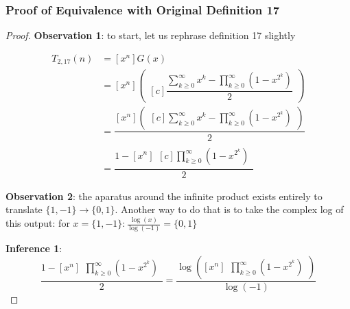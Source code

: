 \documentclass[conference]{IEEEtran}
\begin{document}

\subsubsection{Proof of Equivalence with Original Definition 17}

\begin{proof}
\par\noindent\par
\textbf{Observation 1}: to start, let us rephrase definition 17 slightly

\begin{equation}
\begin{aligned}
T_{2,17}(n) &= [x^n]G(x) \\
    &= [x^n] \left(\begin{aligned}[c]
    \dfrac{\displaystyle\sum_{k\ge0}^\infty x^k - \prod_{k \ge 0}^\infty (1 - x^{2^k})}{2}
    \end{aligned}\right) \\
    &= \dfrac{[x^n] \left(\begin{aligned}[c]
    \displaystyle\sum_{k\ge0}^\infty x^k - \prod_{k \ge 0}^\infty (1 - x^{2^k})\end{aligned}\right)}{2}
     \\
    &= \dfrac{1 - [x^n]\begin{aligned}[c]
    \displaystyle\prod_{k \ge 0}^\infty (1 - x^{2^k})
    \end{aligned}
    }{2}
\end{aligned}
\end{equation}

\textbf{Observation 2}: the aparatus around the infinite product exists entirely to translate $\{1, -1\} \to \{0, 1\}$. Another way to do that is to take the complex log of this output: for $x = \{1, -1\}: \tfrac{\log(x)}{\log(-1)} = \{0, 1\}$

\textbf{Inference 1}: \begin{equation}
    \dfrac{1 - [x^n]\begin{aligned}
    \displaystyle\prod_{k \ge 0}^\infty (1 - x^{2^k})
    \end{aligned}
    }{2} = \dfrac{\log\left([x^n]\begin{aligned}
    \displaystyle\prod_{k \ge 0}^\infty (1 - x^{2^k})
    \end{aligned}\right)}{\log(-1)}
\end{equation}


\end{proof}
\end{document}
